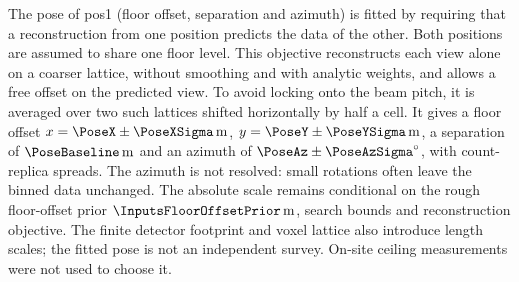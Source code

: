 The pose of pos1 (floor offset, separation and azimuth) is fitted by requiring that a reconstruction from one position predicts the data of the other. Both positions are assumed to share one floor level. This objective reconstructs each view alone on a coarser lattice, without smoothing and with analytic weights, and allows a free offset on the predicted view. To avoid locking onto the beam pitch, it is averaged over two such lattices shifted horizontally by half a cell. It gives a floor offset $x=\PoseX\pm\PoseXSigma\,\mathrm{m}$, $y=\PoseY\pm\PoseYSigma\,\mathrm{m}$, a separation of $\PoseBaseline\,\mathrm{m}$ and an azimuth of $\PoseAz\pm\PoseAzSigma^\circ$, with count-replica spreads. The azimuth is not resolved: small rotations often leave the binned data unchanged. The absolute scale remains conditional on the rough floor-offset prior $\InputsFloorOffsetPrior\,\mathrm{m}$, search bounds and reconstruction objective. The finite detector footprint and voxel lattice also introduce length scales; the fitted pose is not an independent survey. On-site ceiling measurements were not used to choose it.
